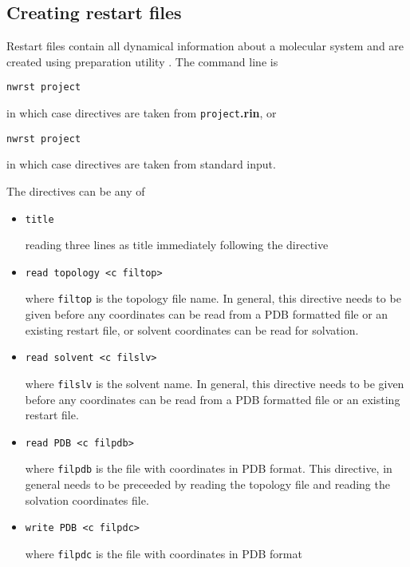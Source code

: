 \subsection{Creating restart files}
\label{nwrst}
Restart files contain all dynamical information about a molecular
system and are created using preparation utility \nwrst. The command
line is
\begin{verbatim}
nwrst project
\end{verbatim}
in which case directives are taken from {\tt project}{\bf.rin}, or
\begin{verbatim}
nwrst project
\end{verbatim}
in which case directives are taken from standard input.
\par
The directives can be any of
\begin{itemize}

\item
\begin{verbatim}
title
\end{verbatim}
reading three lines as title immediately following the directive

\item
\begin{verbatim}
read topology <c filtop>
\end{verbatim}
where {\tt filtop} is the topology file name. In general, this
directive needs to be given before any coordinates can be read from a
PDB formatted file or an existing restart file, or solvent coordinates
can be read for solvation.

\item
\begin{verbatim}
read solvent <c filslv>
\end{verbatim}
where {\tt filslv} is the solvent name. In general, this directive
needs to be given before any coordinates can be read from a PDB
formatted file or an existing restart file.

\item
\begin{verbatim}
read PDB <c filpdb>
\end{verbatim}
where {\tt filpdb} is the file with coordinates in PDB format. This
directive, in general needs to be preceeded by reading the topology
file and reading the solvation coordinates file.

\item
\begin{verbatim}
write PDB <c filpdc>
\end{verbatim}
where {\tt filpdc} is the file with coordinates in PDB format


\end{itemize}
